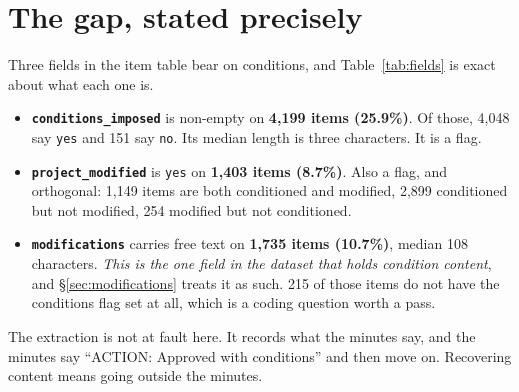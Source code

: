 \documentclass[11pt]{article}
\begin{document}
\begin{abstract}
\medskip\noindent
\textbf{The conditions are templated, and a small scheme spans them.} The 225 packets yield
216 distinct condition headings over \textbf{1{,}622 impositions}, and a thirteen-category
keyword scheme --- split into conditions that change the \emph{project} and conditions that
change its \emph{obligations} --- reaches \textbf{85.6\% of those impositions} and 72.3\% of
the \texttt{modifications} field, the one place the existing dataset already holds condition
content. The split between the families is the sharpest result in the memo: weighted by how
often they are imposed, \textbf{58.4\% of staff's conditions change the project's obligations
and 12.8\% change the project}, while in the Commission's own amendments the proportions are
reversed.
\end{abstract}

\tableofcontents
\newpage

\section{The gap, stated precisely}

Three fields in the item table bear on conditions, and Table~\ref{tab:fields} is exact about
what each one is.

\begin{itemize}
\item \textbf{\texttt{conditions\_imposed}} is non-empty on \textbf{4{,}199 items (25.9\%)}. Of
those, 4{,}048 say \texttt{yes} and 151 say \texttt{no}. Its median length is three
characters. It is a flag.
\item \textbf{\texttt{project\_modified}} is \texttt{yes} on \textbf{1{,}403 items (8.7\%)}.
Also a flag, and orthogonal: 1{,}149 items are both conditioned and modified, 2{,}899
conditioned but not modified, 254 modified but not conditioned.
\item \textbf{\texttt{modifications}} carries free text on \textbf{1{,}735 items (10.7\%)},
median 108 characters. \emph{This is the one field in the dataset that holds condition
content}, and \S\ref{sec:modifications} treats it as such. 215 of those items do not have the
conditions flag set at all, which is a coding question worth a pass.
\end{itemize}

The extraction is not at fault here. It records what the minutes say, and the minutes say
``ACTION: Approved with conditions'' and then move on. Recovering content means going outside
the minutes.
\end{document}
